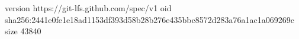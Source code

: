 version https://git-lfs.github.com/spec/v1
oid sha256:2441e0fe1e18ad1153df393d58b28b276e435bbc8572d283a76a1ac1a069269c
size 43840
